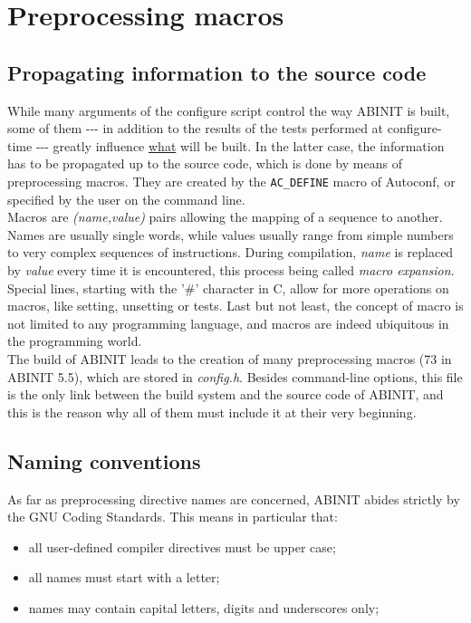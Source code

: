 \chapter{Preprocessing macros}

\section{Propagating information to the source code}

While many arguments of the configure script control the way ABINIT
is built, some of them -{-}- in addition to the results of the tests
performed at configure-time -{-}- greatly influence \underline{what} will
be built. In the latter case, the information has to be propagated up to
the source code, which is done by means of preprocessing macros. They
are created by the \texttt{AC\_DEFINE} macro of Autoconf, or specified by
the user on the command line.
\\

Macros are \textit{(name,value)} pairs allowing the mapping of a sequence to
another. Names are usually single words, while values usually range from
simple numbers to very complex sequences of instructions. During
compilation, \textit{name} is replaced by \textit{value} every time it
is encountered, this process being called \textit{macro expansion}.
Special lines, starting with the '\#' character in C, allow for more
operations on macros, like setting, unsetting or tests. Last but not
least, the concept of macro is not limited to any programming language,
and macros are indeed ubiquitous in the programming world.
\\

The build of ABINIT leads to the creation of many preprocessing macros
(73 in ABINIT 5.5), which are stored in \textit{config.h}. Besides
command-line options, this file is the only link between the build
system and the source code of ABINIT, and this is the reason why all of
them must include it at their very beginning.

\section{Naming conventions}

As far as preprocessing directive names are concerned, ABINIT abides
strictly by the GNU Coding Standards. This means in particular that:
\begin{itemize}
 \item
 all user-defined compiler directives must be upper case;
 \item
 all names must start with a letter;
 \item
 names may contain capital letters, digits and underscores only;
\end{itemize}

